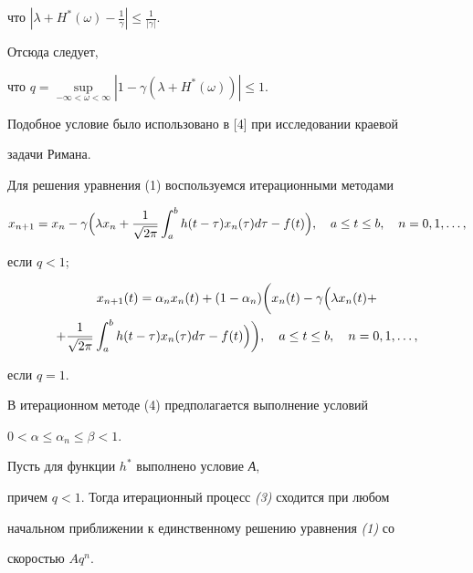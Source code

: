 что $| \lambda+H^*(\omega)-\frac{1}{\gamma}|\le \frac{1}{|\gamma |}$.


Отсюда следует,


что $q=\sup\limits_{-\infty<\omega<\infty}


|1-\gamma(\lambda+H^*(\omega))|\le 1$.


Подобное условие было использовано в [4] при исследовании краевой


задачи Римана.





Для решения уравнения (1) воспользуемся итерационными методами


\begin{equation}


x_{n+1}=x_n-\gamma\Bigl(\lambda x_n


+\frac{1}{\sqrt{2\pi}}\int_a^b h(t-\tau) x_n(\tau)


d\tau-f(t)\Bigr),\quad a \le t\le b,\quad n=0,1,\dotsc,


\end{equation}


если $q<1$;


\begin{multline}


x_{n+1} (t)=\alpha_n x_n(t) +


(1-\alpha_n)\biggl(x_n(t)-\gamma\Bigl(\lambda x_n(t)+\\


%


+\frac{1}{\sqrt{2\pi}}


\int_a^b h(t-\tau) x_n(\tau)


d\tau-f(t)\Bigr)\biggr),\quad a \le t\le b,\quad n=0,1,\dotsc,


\end{multline}


если $q=1$.





В итерационном методе (4) предполагается выполнение условий


$ 0<\alpha \le \alpha_n\le \beta<1$.





\begin{thm} Пусть для функции $h^*$ выполнено условие {\em А},


причем $ q<1$. Тогда итерационный процесс {\em (3)} сходится при любом


начальном приближении к единственному решению уравнения {\em (1)} со


скоростью $Aq^n$.


\end{thm}





